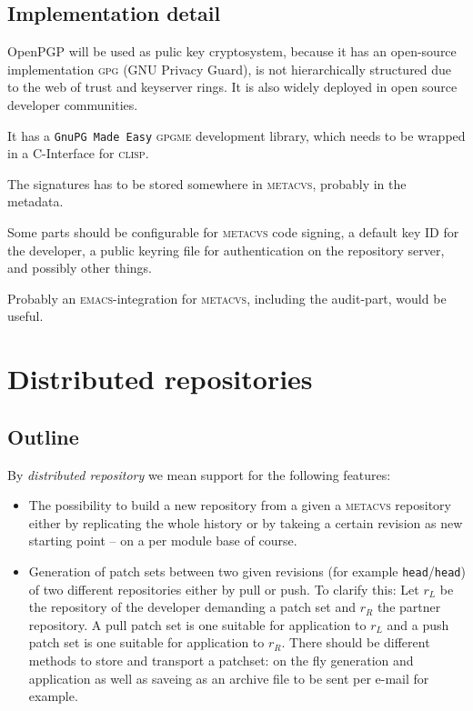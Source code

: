 \documentclass[german, 10pt, a4paper]{article}
\begin{document}
\subsection{Implementation detail}
OpenPGP will be used as pulic key cryptosystem, because it has an
open-source implementation \textsc{gpg} (GNU Privacy Guard), is not
hierarchically structured due to the web of trust and keyserver rings.
It is also widely deployed in open source developer communities.

It has a \texttt{GnuPG Made Easy} \textsc{gpgme} development library,
which needs to be wrapped in a C-Interface for \textsc{clisp}.

The signatures has to be stored somewhere in \textsc{metacvs}, probably
in the metadata.

Some parts should be configurable for \textsc{metacvs} code signing,
a default key ID for the developer, a public keyring file for authentication
on the repository server, and possibly other things.

Probably an \textsc{emacs}-integration for \textsc{metacvs}, including the
audit-part, would be useful.


\section{Distributed repositories}

\subsection{Outline}
By \emph{distributed repository} we mean support for the following
features:

\begin{itemize}
\item The possibility to build a new repository from a given a 
\textsc{metacvs} repository either by replicating the whole history or
by takeing a certain revision as new starting point -- on a per module
base of course.
\item Generation of patch sets between two given revisions (for example
\texttt{head}/\texttt{head}) of two different repositories either by pull
or push. To clarify this: Let $r_L$ be the repository of the developer
demanding a patch set and $r_R$ the partner repository. A pull patch set
is one suitable for application to $r_L$ and a push patch set is one
suitable for application to $r_R$.
There should be different methods to store and transport a patchset:
on the fly generation and application as well as saveing as an archive file
to be sent per e-mail for example.
\end{itemize}
\end{document}
